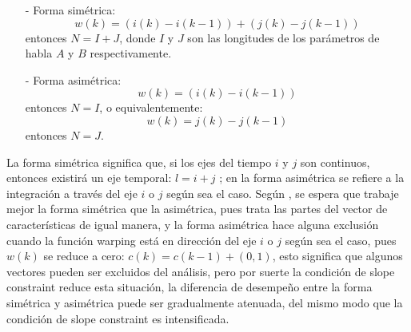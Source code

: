\begin{enumerate}
\begin{enumerate}
\begin{enumerate}
\item[-]Forma simétrica:
\begin{equation}
\label{eq:ecuacion89}
w(k) = (i(k) - i(k - 1)) + (j(k) - j(k - 1))
\end{equation}
entonces $N = I + J$, donde $I$ y $J$ son las longitudes de los parámetros de habla $A$ y $B$ respectivamente.
\item[-]Forma asimétrica:
\begin{equation}
\label{eq:ecuacion90}
w(k) = (i(k) - i(k-1))
\end{equation}
entonces $N = I$, o equivalentemente:
\begin{equation}
\label{eq:ecuacion91}
w(k) = j(k) - j(k - 1)
\end{equation}
entonces $N = J$.
\end{enumerate}

La forma simétrica significa que, si los ejes del tiempo $i$ y $j$ son continuos, entonces existirá un eje temporal: $l = i + j$ ; en la forma asimétrica se refiere a la integración a través del eje $i$ o $j$ según sea el caso. Según \cite{sakoe}, se espera que trabaje mejor la forma simétrica que la asimétrica, pues trata las partes del vector de características de igual manera, y la forma asimétrica hace alguna exclusión cuando la función warping está en dirección del eje $i$ o $j$ según sea el caso, pues $w(k)$ se reduce a cero: $c(k) = c(k-1)+(0,1)$, esto significa que algunos vectores pueden ser excluidos del análisis, pero por suerte la condición de slope constraint reduce esta situación, la diferencia de desempeño entre la forma simétrica y asimétrica puede ser gradualmente atenuada, del mismo modo que la condición de slope constraint es intensificada.


\end{enumerate}
\end{enumerate}
